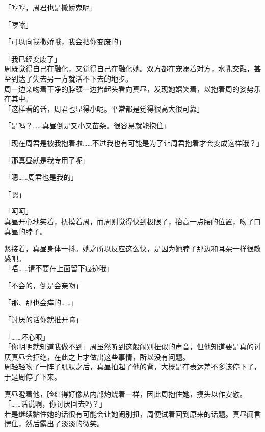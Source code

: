 「哼哼，周君也是撒娇鬼呢」

「啰嗦」

「可以向我撒娇哦，我会把你变废的」

「我已经变废了」\\

周既觉得自己在融化，又觉得自己在融化她。双方都在宠溺着对方，水乳交融，甚至到达了失去另一方就活不下去的地步。\\

周一边亲吻着干净的脖颈一边抬起头看向真昼，发现她嬉笑着，以抱着周的姿势乐在其中。\\

「这样看的话，周君也显得小呢。平常都是觉得很高大很可靠」

「是吗？……真昼倒是又小又苗条。很容易就能抱住」

「现在周君是被我抱着啦……不过我也有可能是为了让周君抱着才会变成这样哦？」

「那真昼就是我专用了呢」

「嗯……周君也是我的」

「嗯」

「呵呵」\\

真昼开心地笑着，抚摸着周，而周则觉得快到极限了，抬高一点腰的位置，吻了口真昼的脖子。

紧接着，真昼身体一抖。她之所以反应这么快，是因为她脖子那边和耳朵一样很敏感吧。\\

「唔……请不要在上面留下痕迹哦」

「不会的，倒是会亲吻」

「那、那也会痒的……」

「讨厌的话你就推开嘛」

「……坏心眼」\\

「你明明就知道我做不到」周虽然听到这般闹别扭似的声音，但他知道要是真的讨厌真昼会拒绝，在此之上才做出这些事情，所以没有问题。\\

周轻轻吻了一阵子肌肤之后，真昼拍起了他的背，大概是在表达差不多该停下了，于是周停了下来。

真昼瞪着他，脸红得好像从内部灼烧着一样，因此周抱住她，摸头以作安慰。\\

「……话说啊，你讨厌回去吗？」\\

若是继续黏住她的话很有可能会让她闹别扭，周便试着回到原来的话题。真昼闻言愣住，然后露出了淡淡的微笑。\\

